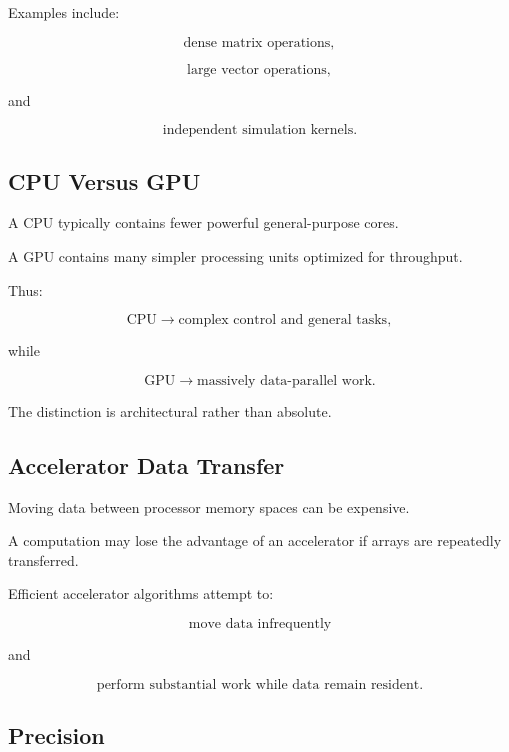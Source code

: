 Examples include:

\[
\boxed{
\text{dense matrix operations},
}
\]

\[
\boxed{
\text{large vector operations},
}
\]

and

\[
\boxed{
\text{independent simulation kernels}.
}
\]

\subsection{CPU Versus GPU}
\label{subsec:cpu-versus-gpu}

A CPU typically contains fewer powerful general-purpose cores.

A GPU contains many simpler processing units optimized for throughput.

Thus:

\[
\boxed{
\text{CPU}
\rightarrow
\text{complex control and general tasks},
}
\]

while

\[
\boxed{
\text{GPU}
\rightarrow
\text{massively data-parallel work}.
}
\]

The distinction is architectural rather than absolute.

\subsection{Accelerator Data Transfer}
\label{subsec:accelerator-data-transfer}

Moving data between processor memory spaces can be expensive.

A computation may lose the advantage of an accelerator if arrays are
repeatedly transferred.

Efficient accelerator algorithms attempt to:

\[
\boxed{
\text{move data infrequently}
}
\]

and

\[
\boxed{
\text{perform substantial work while data remain resident}.
}
\]

\subsection{Precision}
\label{subsec:scientific-computing-precision}

